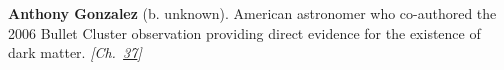 \textbf{Anthony Gonzalez} (b. unknown). American astronomer who co-authored the 2006 Bullet Cluster observation providing direct evidence for the existence of dark matter. \emph{[Ch.~\hyperref[ch:darkmatterevidence]{37}]}


